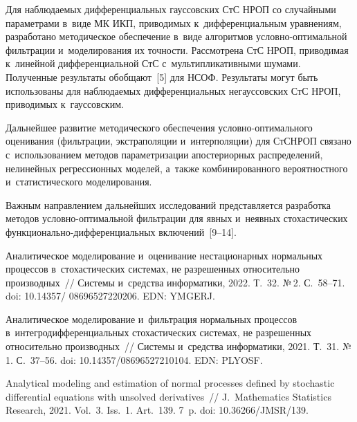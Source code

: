 \begin{multicols}{2}
Для наблюдаемых дифференциальных гауссовских СтС НРОП со случайными параметрами в~виде МК ИКП, приводимых к~дифференциальным уравнениям, разработано 
методическое обеспечение в~виде алгоритмов услов\-но-оп\-ти\-маль\-ной фильт\-ра\-ции 
и~моделирования их точ\-ности. Рассмотрена СтС НРОП, приводимая к~линейной 
дифференциальной СтС с~мультипликативными шумами.
Полученные результаты обобщают~[5] для НСОФ.
Результаты могут быть использованы для наблюда\-емых дифференциальных 
негауссовских СтС НРОП, приводимых к~гауссовским.

Дальнейшее развитие методического обеспечения услов\-но-оп\-ти\-маль\-но\-го оценивания 
(фильтрации, экстраполяции и~интерполяции) для СтС\linebreak НРОП связано 
с~использованием методов па\-ра\-мет\-ри\-за\-ции апостериорных распределений, нелинейных 
регрессионных моделей, а~также комбинированного вероятностного и~статистического 
\mbox{моделирования}.

Важным направлением дальнейших исследований представляется разработка методов 
услов\-но-оп\-ти\-маль\-ной фильт\-ра\-ции для явных и~\mbox{неявных} стохастических функ\-ци\-о\-наль\-но-диф\-фе\-рен\-ци\-аль\-ных включений~[9--14].

{\small\frenchspacing
 {\baselineskip=10.6pt
 \begin{thebibliography}{99}   

\vspace*{-2pt}

Аналитическое моделирование и~оценивание нестационарных нормальных процессов 
в~стохастических сис\-те\-мах, не разрешенных относительно производных~// Сис\-те\-мы 
и~средства информатики, 2022. Т.~32.  №\,2. С.~58--71. doi: 10.14357/ 08696527220206. EDN: YMGERJ.

Аналитическое моделирование и~фильт\-ра\-ция нормальных процессов 
в~интегродифференциальных стохастических сис\-те\-мах, не разрешенных относительно 
производных~// Сис\-те\-мы и~средства информатики, 2021. Т.~31. №\,1. С.~37--56.  doi: 10.14357/08696527210104. EDN: PLYOSF.

Analytical modeling and estimation of normal processes defined by stochastic differential
equations with unsolved derivatives~// J.~Mathematics Statistics Research, 2021. 
Vol.~3. Iss.~1. Art.~139. 7~p. doi: 10.36266/\linebreak JMSR/139. 


\end{thebibliography}}}
\end{multicols}
